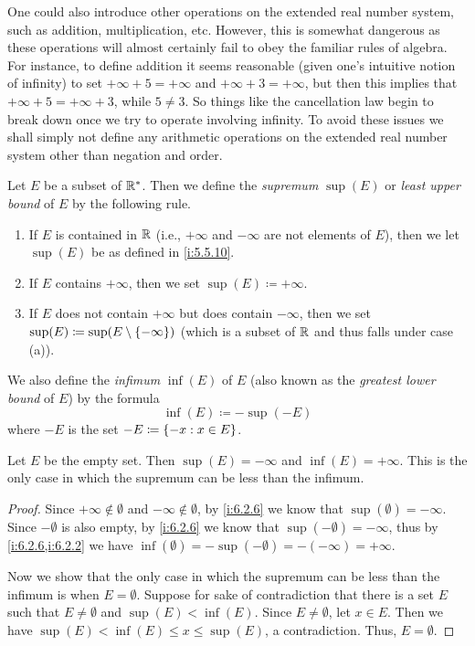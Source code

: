 \begin{note}
  One could also introduce other operations on the extended real number system, such as addition, multiplication, etc.
  However, this is somewhat dangerous as these operations will almost certainly fail to obey the familiar rules of algebra.
  For instance, to define addition it seems reasonable (given one's intuitive notion of infinity) to set \(+\infty + 5 = +\infty\) and \(+\infty + 3 = +\infty\), but then this implies that \(+\infty + 5 = +\infty + 3\), while \(5 \neq 3\).
  So things like the cancellation law begin to break down once we try to operate involving infinity.
  To avoid these issues we shall simply not define any arithmetic operations on the extended real number system other than negation and order.
\end{note}

\begin{defn}\label{i:6.2.6}
  Let \(E\) be a subset of \(\mathbb{R}^*\).
  Then we define the \emph{supremum} \(\sup(E)\) or \emph{least upper bound} of \(E\) by the following rule.
  \begin{enumerate}
    \item If \(E\) is contained in \(\mathbb{R}\) (i.e., \(+\infty\) and \(-\infty\) are not elements of \(E\)), then we let \(\sup(E)\) be as defined in \cref{i:5.5.10}.
    \item If \(E\) contains \(+\infty\), then we set \(\sup(E) \coloneqq +\infty\).
    \item If \(E\) does not contain \(+\infty\) but does contain \(-\infty\), then we set \(\sup(E) \coloneqq \sup(E \setminus \left\lbrace-\infty\right\rbrace)\)
          (which is a subset of \(\mathbb{R}\) and thus falls under case (a)).
  \end{enumerate}
  We also define the \emph{infimum} \(\inf(E)\) of \(E\) (also known as the \emph{greatest lower bound} of \(E\)) by the formula
  \[
    \inf(E) \coloneqq -\sup(-E)
  \]
  where \(-E\) is the set \(-E \coloneqq \left\lbrace-x : x \in E\right\rbrace\).
\end{defn}

\setcounter{thm}{9}
\begin{eg}\label{i:6.2.10}
  Let \(E\) be the empty set.
  Then \(\sup(E) = -\infty\) and \(\inf(E) = +\infty\).
  This is the only case in which the supremum can be less than the infimum.
\end{eg}

\begin{proof}
  Since \(+\infty \notin \emptyset\) and \(-\infty \notin \emptyset\), by \cref{i:6.2.6} we know that \(\sup(\emptyset) = -\infty\).
  Since \(-\emptyset\) is also empty, by \cref{i:6.2.6} we know that \(\sup(-\emptyset) = -\infty\), thus by \cref{i:6.2.6,i:6.2.2} we have \(\inf(\emptyset) = -\sup(-\emptyset) = -(-\infty) = +\infty\).

  Now we show that the only case in which the supremum can be less than the infimum is when \(E = \emptyset\).
  Suppose for sake of contradiction that there is a set \(E\) such that \(E \neq \emptyset\) and \(\sup(E) < \inf(E)\).
  Since \(E \neq \emptyset\), let \(x \in E\).
  Then we have \(\sup(E) < \inf(E) \leq x \leq \sup(E)\), a contradiction.
  Thus, \(E = \emptyset\).
\end{proof}

